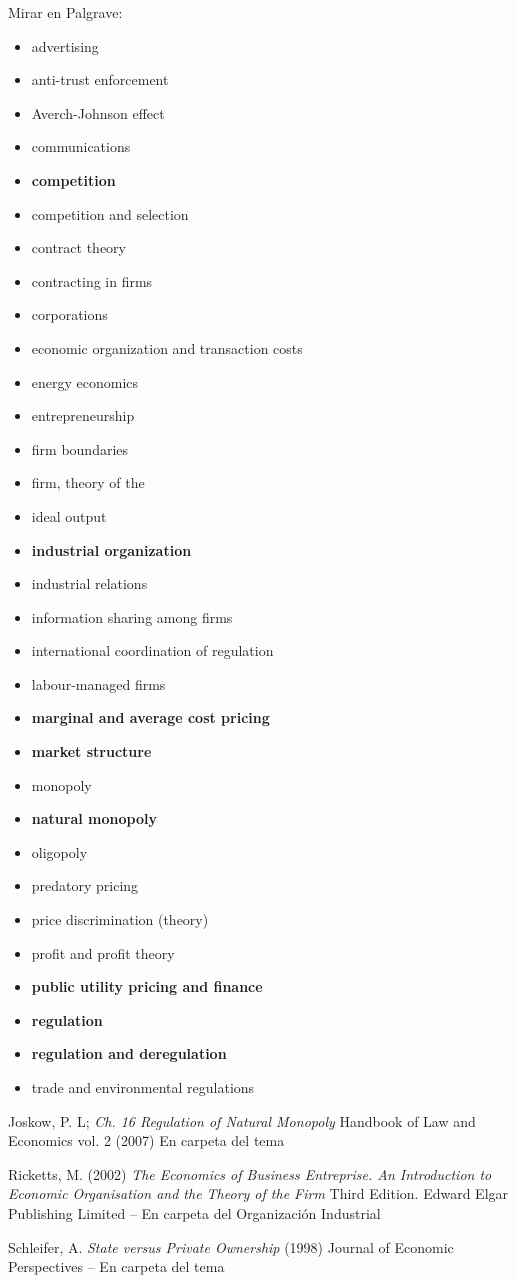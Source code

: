 \documentclass{nuevotema}
\begin{document}
Mirar en Palgrave:
\begin{itemize}
	\item advertising
	\item anti-trust enforcement
	\item Averch-Johnson effect
	\item communications
	\item \textbf{competition}
	\item competition and selection
	\item contract theory
	\item contracting in firms

	\item corporations
	\item economic organization and transaction costs
	\item energy economics
	\item entrepreneurship
	\item firm boundaries
	\item firm, theory of the
	\item ideal output
	\item \textbf{industrial organization}
	\item industrial relations
	\item information sharing among firms
	\item international coordination of regulation
	\item labour-managed firms
	\item \textbf{marginal and average cost pricing}
	\item \textbf{market structure}
	\item monopoly
	\item \textbf{natural monopoly}
	\item oligopoly
	\item predatory pricing
	\item price discrimination (theory)
	\item profit and profit theory
	\item \textbf{public utility pricing and finance}
	\item \textbf{regulation}
	\item \textbf{regulation and deregulation}
	\item trade and environmental regulations
\end{itemize}

Joskow, P. L; \textit{Ch. 16 Regulation of Natural Monopoly} Handbook of Law and Economics vol. 2 (2007) En carpeta del tema

Ricketts, M. (2002) \textit{The Economics of Business Entreprise. An Introduction to Economic Organisation and the Theory of the Firm} Third Edition. Edward Elgar Publishing Limited -- En carpeta del Organización Industrial

Schleifer, A. \textit{State versus Private Ownership} (1998) Journal of Economic Perspectives -- En carpeta del tema
\end{document}
